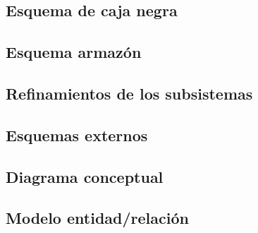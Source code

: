 \subsection{Esquema de caja negra}
\subsection{Esquema armazón}
\subsection{Refinamientos de los subsistemas}
\subsection{Esquemas externos}
\subsection{Diagrama conceptual}
\subsection{Modelo entidad/relación}
